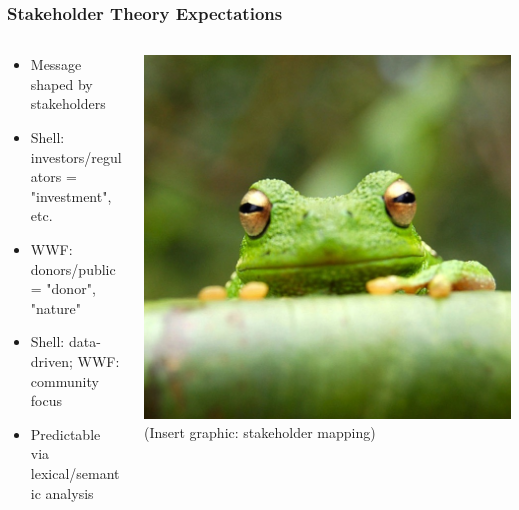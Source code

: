 \documentclass[aspectratio=1610]{beamer}
\begin{document}
\begin{frame}
  \frametitle{Stakeholder Theory Expectations}
  \begin{columns}[t]
    \begin{column}[t]{0.6\textwidth}
      \begin{itemize}
        \item Message shaped by stakeholders
        \item Shell: investors/regulators = "investment", etc.
        \item WWF: donors/public = "donor", "nature"
        \item Shell: data-driven; WWF: community focus
        \item Predictable via lexical/semantic analysis
      \end{itemize}
    \end{column}
    \begin{column}[t]{0.4\textwidth}
      \vspace*{0pt}
      \includegraphics[width=\linewidth]{frog.jpg}
      (Insert graphic: stakeholder mapping)
    \end{column}
  \end{columns}
\end{frame}
\end{document}
